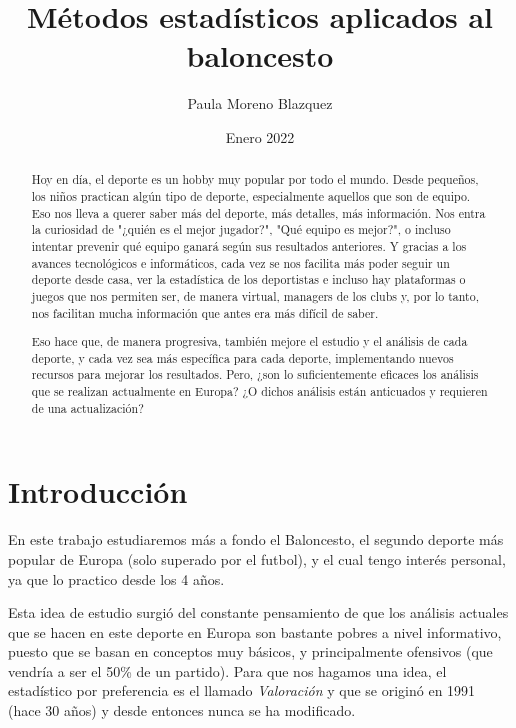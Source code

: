 \documentclass[paper=a4, fontsize=9pt]{article}
\title{Métodos estadísticos aplicados al baloncesto}
\author{Paula Moreno Blazquez}
\date{Enero 2022}
\begin{document}


\maketitle

\clearpage

\begin{abstract}

Hoy en día, el deporte es un hobby muy popular por todo el mundo. Desde pequeños, los niños practican algún tipo de deporte, especialmente aquellos que son de equipo. Eso nos lleva a querer saber más del deporte, más detalles, más información. Nos entra la curiosidad de "¿quién es el mejor jugador?", "Qué equipo es mejor?", o incluso intentar prevenir qué equipo ganará según sus resultados anteriores. Y gracias a los avances tecnológicos e informáticos, cada vez se nos facilita más poder seguir un deporte desde casa, ver la estadística de los deportistas e incluso hay plataformas o juegos que nos permiten ser, de manera virtual, managers de los clubs y, por lo tanto, nos facilitan mucha información que antes era más difícil de saber.

Eso hace que, de manera progresiva, también mejore el estudio y el análisis de cada deporte, y cada vez sea más específica para cada deporte, implementando nuevos recursos para mejorar los resultados. Pero, ¿son lo suficientemente eficaces los análisis que se realizan actualmente en Europa? ¿O dichos análisis están anticuados y requieren de una actualización?

\end{abstract}

\pagebreak            
\newpage              

\tableofcontents

\clearpage



\section{Introducción}

En este trabajo estudiaremos más a fondo el Baloncesto, el segundo deporte más popular de Europa (solo superado por el futbol), y el cual tengo interés personal, ya que lo practico desde los 4 años.

Esta idea de estudio surgió del constante pensamiento de que los análisis actuales que se hacen en este deporte en Europa son bastante pobres a nivel informativo, puesto que se basan en conceptos muy básicos, y principalmente ofensivos (que vendría a ser el 50\% de un partido). Para que nos hagamos una idea, el estadístico por preferencia es el llamado \emph{Valoración} y que se originó en 1991 (hace 30 años) y desde entonces nunca se ha modificado.
\end{document}
